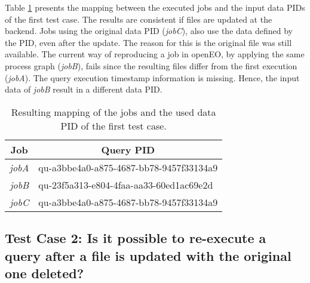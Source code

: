 \documentclass[draft,final]{vutinfth} %
\begin{document}
Table \ref{Tab:eva_datachanges4} presents the mapping between the executed jobs and the input data PIDs of the first test case. The results are consistent if files are updated at the backend. Jobs using the original data PID (\textit{jobC}), also use the data defined by the PID, even after the update. The reason for this is the original file was still available. The current way of reproducing a job in openEO, by applying the same process graph (\textit{jobB}), fails since the resulting files differ from the first execution (\textit{jobA}). The query execution timestamp information is missing. Hence, the input data of \textit{jobB} result in a different data PID.       

\begin{table}[]
	\caption{Resulting mapping of the jobs and the used data PID of the first test case.}
	\centering
	\begin{tabular}{|r|l|}
		\hline \multicolumn{1}{|c|}{\textbf{Job}}  &  \multicolumn{1}{c|}{\textbf{Query PID}} \\ \hline
		\textit{jobA} & qu-a3bbe4a0-a875-4687-bb78-9457f33134a9  \\ 
		\textit{jobB} & qu-23f5a313-e804-4faa-aa33-60ed1ac69e2d \\
		\textit{jobC} & qu-a3bbe4a0-a875-4687-bb78-9457f33134a9  \\ \hline
	\end{tabular}
	\label{Tab:eva_datachanges4}
\end{table}
\newpage
\subsection{Test Case 2: Is it possible to re-execute a query after a file is updated with the original one deleted?}
\end{document}
